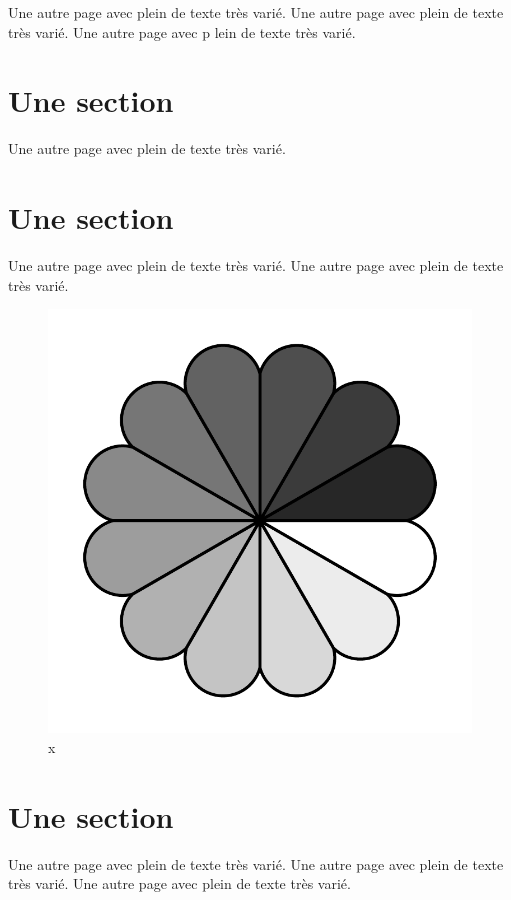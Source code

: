 \documentclass[11pt]{thesul}
\begin{document}
Une autre page avec plein de texte très varié.
Une autre page avec plein de texte très varié.
Une autre page avec p
lein de texte très varié.

\section{Une section}

Une autre page avec plein de texte très varié.

\section{Une section}

Une autre page avec plein de texte très varié.
Une autre page avec plein de texte très varié.
\begin{figure}[htb]
\includegraphics{rosette}
\caption{x}
\end{figure}

\section{Une section}

Une autre page avec plein de texte très varié.
Une autre page avec plein de texte très varié.
Une autre page avec plein de texte très varié.
\end{document}
